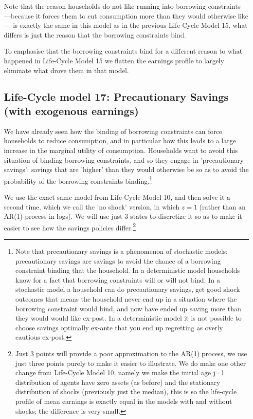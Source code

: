 Note that the reason households do not like running into borrowing constraints ---because it forces them to cut consumption more than they would otherwise like--- is exactly the same in this model as in the previous Life-Cycle Model 15, what differs is just the reason that the borrowing constraints bind.

To emphasise that the borrowing constraints bind for a different reason to what happened in Life-Cycle Model 15 we flatten the earnings profile to largely eliminate what drove them in that model.

\subsection{Life-Cycle model 17: Precautionary Savings (with exogenous earnings)}
We have already seen how the binding of borrowing constraints can force households to reduce consumption, and in particular how this leads to a large increase in the marginal utility of consumption. Households want to avoid this situation of binding borrowing constraints, and so they engage in 'precautionary savings': savings that are 'higher' than they would otherwise be so as to avoid the probability of the borrowing constraints binding.\footnote{Note that precautionary savings is a phenomenon of stochastic models: precautionary savings are savings to avoid the chance of a borrowing constraint binding that the household. In a deterministic model households know for a fact that borrowing constraints will or will not bind. In a stochastic model a household can do precautionary savings, get good shock outcomes that means the household never end up in a situation where the borrowing constraint would bind, and now have ended up saving more than they would would like ex-post. In a deterministic model it is not possible to choose savings optimally ex-ante that you end up regretting as overly cautious ex-post.}

We use the exact same model from Life-Cycle Model 10, and then solve it a second time, which we call the 'no shock' version, in which $z=1$ (rather than an AR(1) process in logs). We will use just 3 states to discretize it so as to make it easier to see how the savings policies differ.\footnote{Just 3 points will provide a poor approximation to the AR(1) process, we use just three points purely to make it easier to illustrate. We do make one other change from Life-Cycle Model 10, namely we make the initial age j=1 distribution of agents have zero assets (as before) and the stationary distribution of shocks (previously just the median), this is so the life-cycle profile of mean earnings is exactly equal in the models with and without shocks; the difference is very small.}

